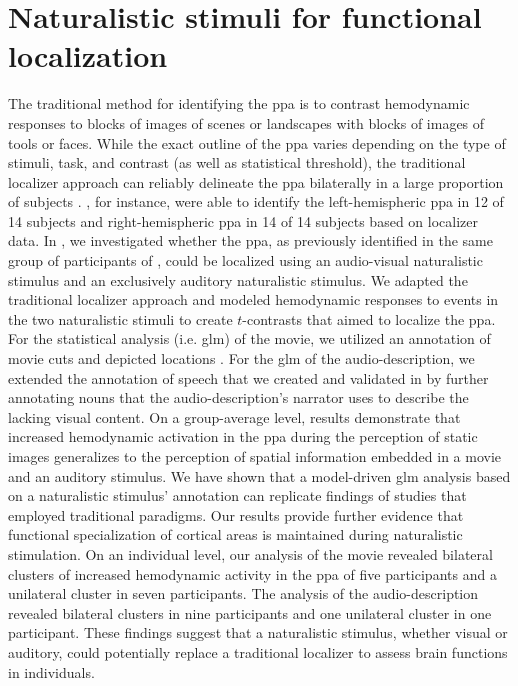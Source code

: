 \section{Naturalistic stimuli for functional localization}

%
The traditional method for identifying the \ac{ppa} is to contrast hemodynamic
responses to blocks of images of scenes or landscapes with blocks of images of
tools or faces.
%
While the exact outline of the \ac{ppa} varies depending on the type of stimuli,
task, and contrast (as well as statistical threshold), the traditional localizer
approach can reliably delineate the \ac{ppa} bilaterally in a large proportion
of subjects \citep{zhen2017quantifying}.
%
\citet{sengupta2016extension}, for instance, were able to identify the
left-hemispheric \ac{ppa} in 12 of 14 subjects and right-hemispheric \ac{ppa} in
14 of 14 subjects based on localizer data.
In \citet{haeusler2022processing}, we investigated whether the \ac{ppa}, as
previously identified in the same group of participants of
\citet{sengupta2016extension}, could be localized using an audio-visual
naturalistic stimulus and an exclusively auditory naturalistic stimulus.
We adapted the traditional localizer approach and modeled hemodynamic responses
to events in the two naturalistic stimuli to create $t$-contrasts that aimed to
localize the \ac{ppa}.
For the statistical analysis (i.e. \ac{glm}) of the movie, we utilized an
annotation of movie cuts and depicted locations \citep{haeusler2016cutanno}.
For the \ac{glm} of the audio-description, we extended the annotation of speech
that we created and validated in \citet{haeusler2021speechanno} by further
annotating nouns that the audio-description's narrator uses to describe the
lacking visual content.
On a group-average level, results demonstrate that increased hemodynamic
activation in the \ac{ppa} during the perception of static images generalizes to
the perception of spatial information embedded in a movie and an auditory
stimulus.
%
We have shown that a model-driven \ac{glm} analysis based on a naturalistic
stimulus' annotation can replicate findings of studies that employed traditional
paradigms.
%
Our results provide further evidence \citep[cf.][]{bartels2004mapping} that
functional specialization of cortical areas is maintained during naturalistic
stimulation.
On an individual level, our analysis of the movie revealed bilateral clusters of
increased hemodynamic activity in the \ac{ppa} of five participants and a
unilateral cluster in seven participants.
%
The analysis of the audio-description revealed bilateral clusters in nine
participants and one unilateral cluster in one participant.
These findings suggest that a naturalistic stimulus, whether visual or auditory,
could potentially replace a traditional localizer to assess brain functions in
individuals.



